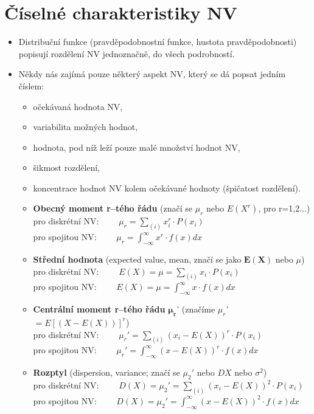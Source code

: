\section{Číselné charakteristiky NV}
\begin{itemize}
    \item Distribuční funkce (pravděpodobnostní funkce, hustota pravděpodobnosti) popisují rozdělení NV jednoznačně, do všech podrobností.
    \item Někdy nás zajímá pouze některý aspekt NV, který se dá popsat jedním číslem:
          \begin{itemize}
              \item očekávaná hodnota NV,
              \item variabilita možných hodnot,
              \item hodnota, pod níž leží pouze malé množství hodnot NV,
              \item šikmost rozdělení,
              \item koncentrace hodnot NV kolem očekávané hodnoty (špičatost rozdělení).\\

              \item \textbf{Obecný moment r--tého řádu} (značí se $\mu_r$ nebo $E(X^r)$, pro r=1,2...) \\pro diskrétní NV: $\qquad \mu_r = \sum_{(i)}x_i^r \cdot P(x_i)$ \\pro spojitou NV: $\qquad \mu_r = \int_{-\infty}^{\infty} x^r \cdot f(x) dx$
              \item \textbf{Střední hodnota} (expected value, mean, značí se jako $\mathbf{E(X)}$ nebo $\mu$) \\pro diskrétní NV: $\qquad E(X) = \mu = \sum_{(i)}x_i \cdot P(x_i)$\\pro spojitou NV: $\qquad E(X) = \mu = \int_{-\infty}^{\infty} x \cdot f(x)dx$
              \item \textbf{Centrální moment r--tého řádu} $\mathbf{\mu_r}$' (značíme $\mu_r$' $= E[(X - E(X))]^r$) \\pro diskrétní NV: $\qquad \mu_r' = \sum_{(i)}(x_i -E(X))^r \cdot P(x_i)$\\pro spojitou NV: $\qquad \mu_r' = \int_{-\infty}^{\infty} (x - E(X))^r \cdot f(x)dx$
              \item \textbf{Rozptyl} (dispersion, variance; značí se $\mu_2'$ nebo $DX$ nebo $\sigma^2$) \\pro diskrétní NV: $\qquad D(X) = \mu_2' = \sum_{(i)}(x_i -E(X))^2 \cdot P(x_i)$\\pro spojitou NV: $\qquad D(X) = \mu_2' = \int_{-\infty}^{\infty} (x - E(X))^2 \cdot f(x)dx$
          \end{itemize}
\end{itemize}

